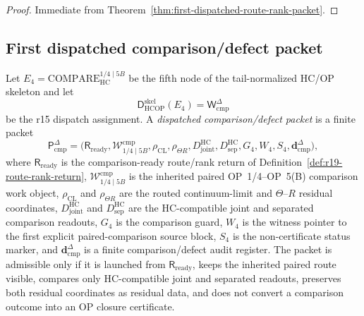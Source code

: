 \begin{proof}
Immediate from Theorem~\ref{thm:first-dispatched-route-rank-packet}.
\end{proof}


\subsection{First dispatched comparison/defect packet}
\label{subsec:first-dispatched-comparison-defect-packet}

\begin{definition}
\label{def:dispatched-comparison-defect-packet}
Let \(E_4=\mathrm{COMPARE}_{\mathrm{HC}}^{1/4\mid 5B}\) be the fifth node of the tail-normalized HC/OP skeleton and let
\[
  \mathsf D_{\mathrm{HCOP}}^{\mathrm{skel}}(E_4)
  =
  \mathsf W_{\mathrm{cmp}}^{\Delta}
\]
be the r15 dispatch assignment.  A \emph{dispatched comparison/defect packet} is a finite packet
\[
  \mathsf P_{\mathrm{cmp}}^{\Delta}
  =
  \bigl(\mathsf R_{\mathrm{ready}},
        \mathcal W_{1/4\mid 5B}^{\mathrm{cmp}},
        \rho_{\mathrm{CL}},\rho_{\Theta R},
        D_{\mathrm{joint}}^{\mathrm{HC}},D_{\mathrm{sep}}^{\mathrm{HC}},
        G_4,W_4,S_4,
        \mathbf d_{\mathrm{cmp}}^{\Delta}\bigr),
\]
where \(\mathsf R_{\mathrm{ready}}\) is the comparison-ready route/rank return of Definition~\ref{def:r19-route-rank-return}, \(\mathcal W_{1/4\mid 5B}^{\mathrm{cmp}}\) is the inherited paired OP~1/4--OP~5(B) comparison work object, \(\rho_{\mathrm{CL}}\) and \(\rho_{\Theta R}\) are the routed continuum-limit and \(\Theta\)--\(R\) residual coordinates, \(D_{\mathrm{joint}}^{\mathrm{HC}}\) and \(D_{\mathrm{sep}}^{\mathrm{HC}}\) are the HC-compatible joint and separated comparison readouts, \(G_4\) is the comparison guard, \(W_4\) is the witness pointer to the first explicit paired-comparison source block, \(S_4\) is the non-certificate status marker, and \(\mathbf d_{\mathrm{cmp}}^{\Delta}\) is a finite comparison/defect audit register.  The packet is admissible only if it is launched from \(\mathsf R_{\mathrm{ready}}\), keeps the inherited paired route visible, compares only HC-compatible joint and separated readouts, preserves both residual coordinates as residual data, and does not convert a comparison outcome into an OP closure certificate.
\end{definition}

